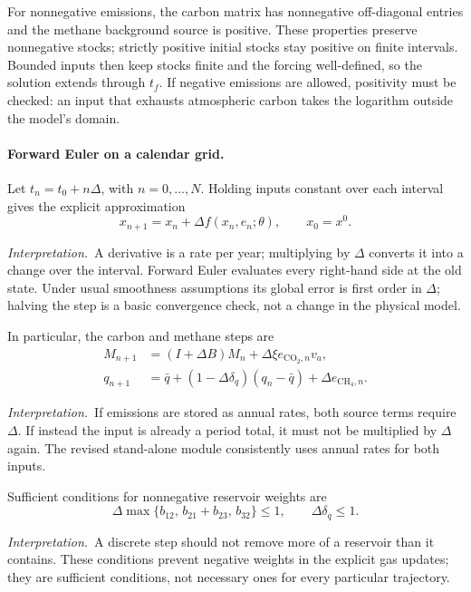 \documentclass[11pt,a4paper]{article}
\newcommand{\interp}{\par\smallskip\noindent\textit{Interpretation.}\ }
\begin{document}
For nonnegative emissions, the carbon matrix has nonnegative off-diagonal
entries and the methane background source is positive. These properties
preserve nonnegative stocks; strictly positive initial stocks stay positive
on finite intervals. Bounded inputs then keep stocks finite and the forcing
well-defined, so the solution extends through $t_f$. If negative emissions
are allowed, positivity must be checked: an input that exhausts atmospheric
carbon takes the logarithm outside the model's domain.

\paragraph{Forward Euler on a calendar grid.}
Let $t_n=t_0+n\Delta$, with $n=0,\ldots,N$. Holding inputs constant
over each interval gives the explicit approximation
\begin{equation}\label{eq:euler}
 x_{n+1}=x_n+\Delta f(x_n,e_n;\theta),\qquad x_0=x^0.
\end{equation}
\interp A derivative is a rate per year; multiplying by $\Delta$ converts
it into a change over the interval. Forward Euler evaluates every
right-hand side at the old state. Under usual smoothness assumptions its
global error is first order in $\Delta$; halving the step is a basic
convergence check, not a change in the physical model.

In particular, the carbon and methane steps are
\begin{equation}\label{eq:gassteps}
 \begin{aligned}
 M_{n+1}&=(I+\Delta B)M_n+\Delta\xi e_{\mathrm{CO_2},n}v_a,\\
 q_{n+1}&=\bar q+(1-\Delta\delta_q)(q_n-\bar q)
                         +\Delta e_{\mathrm{CH_4},n}.
 \end{aligned}
\end{equation}
\interp If emissions are stored as annual rates, both source terms require
$\Delta$. If instead the input is already a period total, it must not be
multiplied by $\Delta$ again. The revised stand-alone module consistently
uses annual rates for both inputs.

Sufficient conditions for nonnegative reservoir weights are
\begin{equation}\label{eq:positive}
 \Delta\max\{b_{12},\,b_{21}+b_{23},\,b_{32}\}\leq1,
 \qquad \Delta\delta_q\leq1.
\end{equation}
\interp A discrete step should not remove more of a reservoir than it
contains. These conditions prevent negative weights in the explicit gas
updates; they are sufficient conditions, not necessary ones for every
particular trajectory.
\end{document}
